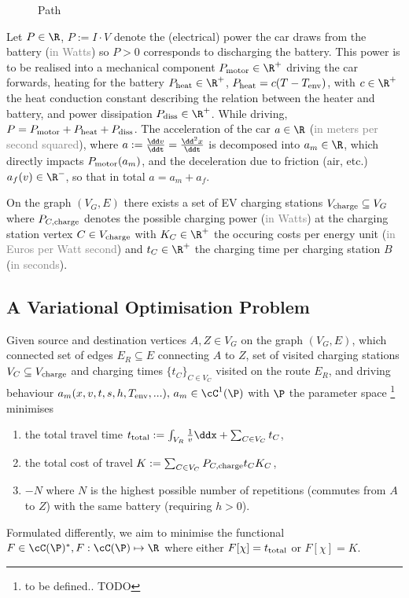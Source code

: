\documentclass{prettytex/ox/mmsc-special-topic}
\begin{document}
  \begin{figure}[H]
    \centering
    \caption{Path}
  \end{figure}

  Let $P \in \R$, $P := I \cdot V$ denote the (electrical) power the car draws from the battery (\textcolor{gray}{in Watts}) so $P > 0$ corresponds to discharging the battery.
  This power is to be realised into a mechanical component $P_{\rm motor} \in \R^+$ driving the car forwards, heating for the battery $P_{\rm heat} \in \R^+$, $P_{\rm heat} = c (T - T_{\rm env})$, with $c \in \R^+$ the heat conduction constant describing the relation between the heater and battery, and power dissipation $P_{\rm diss} \in \R^+$.
  While driving, $P = P_{\rm motor} + P_{\rm heat} + P_{\rm diss}$.
  The acceleration of the car $a \in \R$ (\textcolor{gray}{in meters per second squared}), where $a := \frac{\dd v}{\ddt} = \frac{\dd^2 x}{\ddt}$ is decomposed into $a_m \in \R$, which directly impacts $P_{\rm motor}(a_m)$, and the deceleration due to friction (air, etc.) $a_f(v) \in \R^-$, so that in total $a = a_m + a_f$.

  On the graph $(V_G, E)$ there exists a set of EV charging stations $V_{\rm charge} \subseteq V_G$ where $P_{C,\rm charge}$ denotes the possible charging power (\textcolor{gray}{in Watts}) at the charging station vertex $C \in V_{\rm charge}$ with $K_C \in \R^+$ the occuring costs per energy unit (\textcolor{gray}{in Euros per Watt second}) and $t_C \in \R^+$ the charging time per charging station $B$ (\textcolor{gray}{in seconds}).

  \subsection{A Variational Optimisation Problem}
  Given source and destination vertices $A, Z \in V_G$ on the graph $(V_G, E)$, which connected set of edges $E_R \subseteq E$ connecting $A$ to $Z$,
  set of visited charging stations $V_C \subseteq V_{\rm charge}$ and charging times $\{t_C\}_{C \in V_C}$ visited on the route $E_R$, and driving behaviour $a_m(x, v, t, s, h, T_{\rm env}, ...),\, a_m \in \cC^1(\P)$ with $\P$ the parameter space \footnote{to be defined.. TODO} minimises
  \begin{enumerate}
    \item the total travel time $t_{\rm total} := \int_{V_R} \frac{1}{v} \ddx + \sum_{C \in V_C} t_C$,
    \item the total cost of travel $K := \sum_{C \in V_C} P_{C, \rm charge} t_{C} K_C$,
    \item $-N$ where $N$ is the highest possible number of repetitions (commutes from $A$ to $Z$) with the same battery (requiring $h > 0$).
  \end{enumerate}
  Formulated differently, we aim to minimise the functional
  $F \in \cC(\P)^*, F: \cC(\P) \mapsto \R$ where either $F[\chi] = t_{\rm total}$ or $F[\chi] = K$.
\end{document}
